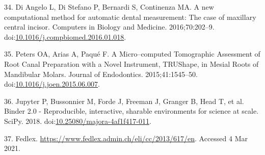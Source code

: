 \documentclass[
  american,
]{article}
\newenvironment{cslreferences}%
  {}%
  {\par}
\begin{document}
\begin{cslreferences}
\leavevmode\hypertarget{ref-1Egw08k0d}{}%
34. Di Angelo L, Di Stefano P, Bernardi S, Continenza MA. A new computational method for automatic dental measurement: The case of maxillary central incisor. Computers in Biology and Medicine. 2016;70:202--9. doi:\href{https://doi.org/10.1016/j.compbiomed.2016.01.018}{10.1016/j.compbiomed.2016.01.018}.

\leavevmode\hypertarget{ref-RxErLYuw}{}%
35. Peters OA, Arias A, Paqué F. A Micro--computed Tomographic Assessment of Root Canal Preparation with a Novel Instrument, TRUShape, in Mesial Roots of Mandibular Molars. Journal of Endodontics. 2015;41:1545--50. doi:\href{https://doi.org/10.1016/j.joen.2015.06.007}{10.1016/j.joen.2015.06.007}.

\leavevmode\hypertarget{ref-Q20Bxdsr}{}%
36. Jupyter P, Bussonnier M, Forde J, Freeman J, Granger B, Head T, et al. Binder 2.0 - Reproducible, interactive, sharable environments for science at scale. SciPy. 2018. doi:\href{https://doi.org/10.25080/majora-4af1f417-011}{10.25080/majora-4af1f417-011}.

\leavevmode\hypertarget{ref-10OKzEtEb}{}%
37. Fedlex. \url{https://www.fedlex.admin.ch/eli/cc/2013/617/en}. Accessed 4 Mar 2021.
\end{cslreferences}
\end{document}
